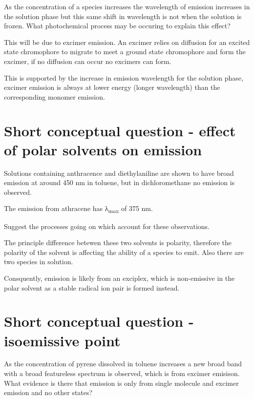 \documentclass[
]{book}
\begin{document}
As the concentration of a species increases the wavelength of emission increases in the solution phase but this same shift in wavelength is not when the solution is frozen. What photochemical process may be occuring to explain this effect?

This will be due to excimer emission. An excimer relies on diffusion for an excited state chromophore to migrate to meet a ground state chromophore and form the excimer, if no diffusion can occur no excimers can form.

This is supported by the increase in emission wavelength for the solution phase, excimer emission is always at lower energy (longer wavelength) than the corresponding monomer emission.

\hypertarget{short-conceptual-question---effect-of-polar-solvents-on-emission}{%
\section{Short conceptual question - effect of polar solvents on emission}\label{short-conceptual-question---effect-of-polar-solvents-on-emission}}

Solutions containing anthracence and diethylaniline are shown to have broad emission at around 450 nm in toluene, but in dichloromethane no emission is observed.

The emission from athracene has λ\textsubscript{max} of 375 nm.

Suggest the processes going on which account for these observations.

The principle difference betewen these two solvents is polarity, therefore the polarity of the solvent is affecting the ability of a species to emit. Also there are two species in solution.

Consquently, emission is likely from an exciplex, which is non-emissive in the polar solvent as a stable radical ion pair is formed instead.

\hypertarget{short-conceptual-question---isoemissive-point}{%
\section{Short conceptual question - isoemissive point}\label{short-conceptual-question---isoemissive-point}}

As the concentration of pyrene dissolved in toluene increases a new broad band with a broad featureless spectrum is observed, which is from excimer emisison. What evidence is there that emission is only from single molecule and excimer emission and no other states?
\end{document}
